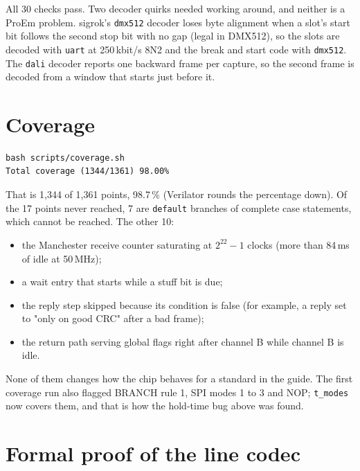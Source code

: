 \documentclass[11pt,a4paper]{article}
\newcommand{\sig}[1]{\texttt{#1}}
\begin{document}
All 30 checks pass. Two decoder quirks needed working around, and neither is a ProEm problem. sigrok's \sig{dmx512} decoder loses byte alignment when a slot's start bit follows the second stop bit with no gap (legal in DMX512), so the slots are decoded with \sig{uart} at 250\,kbit/s 8N2 and the break and start code with \sig{dmx512}. The \sig{dali} decoder reports one backward frame per capture, so the second frame is decoded from a window that starts just before it.

\section{Coverage}

\begin{lstlisting}
bash scripts/coverage.sh
Total coverage (1344/1361) 98.00%
\end{lstlisting}

That is 1,344 of 1,361 points, 98.7\,\% (Verilator rounds the percentage down). Of the 17 points never reached, 7 are \sig{default} branches of complete case statements, which cannot be reached. The other 10:
\begin{itemize}
\item the Manchester receive counter saturating at $2^{22}-1$ clocks (more than 84\,ms of idle at 50\,MHz);
\item a wait entry that starts while a stuff bit is due;
\item the reply step skipped because its condition is false (for example, a reply set to "only on good CRC" after a bad frame);
\item the return path serving global flags right after channel B while channel B is idle.
\end{itemize}
None of them changes how the chip behaves for a standard in the guide. The first coverage run also flagged BRANCH rule 1, SPI modes 1 to 3 and NOP; \sig{t\_modes} now covers them, and that is how the hold-time bug above was found.

\section{Formal proof of the line codec}
\end{document}
